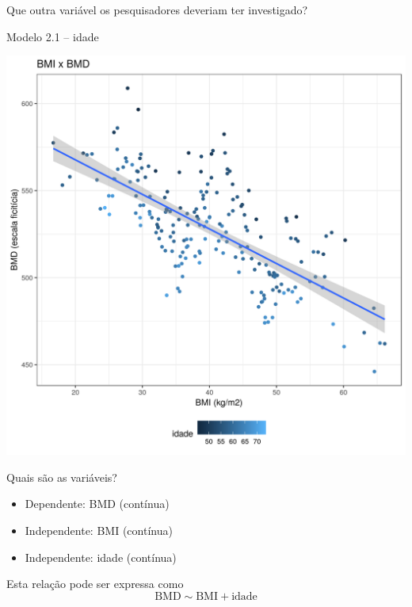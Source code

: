 \documentclass{beamer}
\begin{document}
\begin{frame}{\scriptsize }
  \begin{center}
    Que outra variável os pesquisadores deveriam ter investigado?
  \end{center}
\end{frame}

\begin{frame}{\scriptsize Modelo 2.1 -- idade}
  \begin{center}
    \includegraphics[height=.9\textheight]{Cap31-32/pratica-rlm2_1}
  \end{center}
\end{frame}

\begin{frame}{\scriptsize Quais são as variáveis?}
  \begin{itemize}
  \item Dependente: BMD (contínua)
  \item Independente: BMI (contínua)
  \item Independente: idade (contínua)
  \end{itemize}
  \vfill
  \begin{block}{Esta relação pode ser expressa como}
    \footnotesize
    \begin{displaymath}
      \text{BMD} \sim \text{BMI} + \text{idade}
    \end{displaymath}
  \end{block}
\end{frame}
\end{document}
